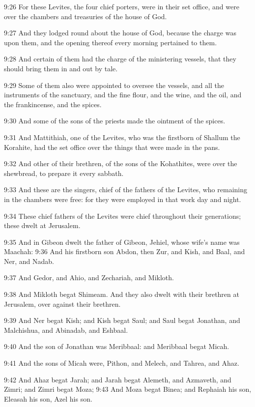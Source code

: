 9:26 For these Levites, the four chief porters, were in their set office, and were over the chambers and treasuries of the house of God.

9:27 And they lodged round about the house of God, because the charge was upon them, and the opening thereof every morning pertained to them.

9:28 And certain of them had the charge of the ministering vessels, that they should bring them in and out by tale.

9:29 Some of them also were appointed to oversee the vessels, and all the instruments of the sanctuary, and the fine flour, and the wine, and the oil, and the frankincense, and the spices.

9:30 And some of the sons of the priests made the ointment of the spices.

9:31 And Mattithiah, one of the Levites, who was the firstborn of Shallum the Korahite, had the set office over the things that were made in the pans.

9:32 And other of their brethren, of the sons of the Kohathites, were over the shewbread, to prepare it every sabbath.

9:33 And these are the singers, chief of the fathers of the Levites, who remaining in the chambers were free: for they were employed in that work day and night.

9:34 These chief fathers of the Levites were chief throughout their generations; these dwelt at Jerusalem.

9:35 And in Gibeon dwelt the father of Gibeon, Jehiel, whose wife's name was Maachah: 9:36 And his firstborn son Abdon, then Zur, and Kish, and Baal, and Ner, and Nadab.

9:37 And Gedor, and Ahio, and Zechariah, and Mikloth.

9:38 And Mikloth begat Shimeam. And they also dwelt with their brethren at Jerusalem, over against their brethren.

9:39 And Ner begat Kish; and Kish begat Saul; and Saul begat Jonathan, and Malchishua, and Abinadab, and Eshbaal.

9:40 And the son of Jonathan was Meribbaal: and Meribbaal begat Micah.

9:41 And the sons of Micah were, Pithon, and Melech, and Tahrea, and Ahaz.

9:42 And Ahaz begat Jarah; and Jarah begat Alemeth, and Azmaveth, and Zimri; and Zimri begat Moza; 9:43 And Moza begat Binea; and Rephaiah his son, Eleasah his son, Azel his son.

